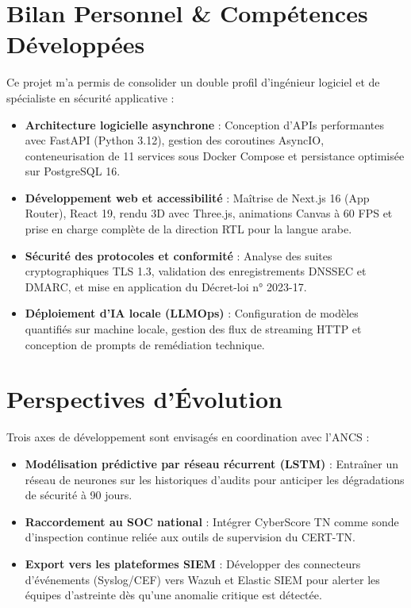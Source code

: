 \section{Bilan Personnel \& Compétences Développées}
Ce projet m'a permis de consolider un double profil d'ingénieur logiciel et de spécialiste en sécurité applicative :
\begin{itemize}
    \item \textbf{Architecture logicielle asynchrone} : Conception d'APIs performantes avec FastAPI (Python 3.12), gestion des coroutines AsyncIO, conteneurisation de 11 services sous Docker Compose et persistance optimisée sur PostgreSQL 16.
    \item \textbf{Développement web et accessibilité} : Maîtrise de Next.js 16 (App Router), React 19, rendu 3D avec Three.js, animations Canvas à 60 FPS et prise en charge complète de la direction RTL pour la langue arabe.
    \item \textbf{Sécurité des protocoles et conformité} : Analyse des suites cryptographiques TLS 1.3, validation des enregistrements DNSSEC et DMARC, et mise en application du Décret-loi n° 2023-17.
    \item \textbf{Déploiement d'IA locale (LLMOps)} : Configuration de modèles quantifiés sur machine locale, gestion des flux de streaming HTTP et conception de prompts de remédiation technique.
\end{itemize}

\section{Perspectives d'Évolution}
Trois axes de développement sont envisagés en coordination avec l'ANCS :
\begin{itemize}
    \item \textbf{Modélisation prédictive par réseau récurrent (LSTM)} : Entraîner un réseau de neurones sur les historiques d'audits pour anticiper les dégradations de sécurité à 90 jours.
    \item \textbf{Raccordement au SOC national} : Intégrer CyberScore TN comme sonde d'inspection continue reliée aux outils de supervision du CERT-TN.
    \item \textbf{Export vers les plateformes SIEM} : Développer des connecteurs d'événements (Syslog/CEF) vers Wazuh et Elastic SIEM pour alerter les équipes d'astreinte dès qu'une anomalie critique est détectée.
\end{itemize}
